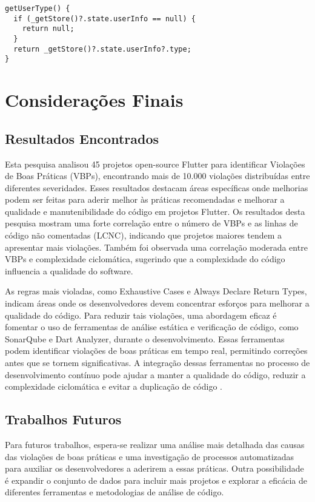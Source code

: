 \documentclass[12pt]{article}
\begin{document}
\begin{tcolorbox}[codeSnippetStyle={gsy\_github\_app\_flutter/lib/page/my\_page.dart}]
\begin{verbatim}
getUserType() {
  if (_getStore()?.state.userInfo == null) {
    return null;
  }
  return _getStore()?.state.userInfo?.type;
}
\end{verbatim}
\end{tcolorbox}

\section{Considerações Finais}
\subsection{Resultados Encontrados}
Esta pesquisa analisou 45 projetos open-source Flutter para identificar Violações de Boas Práticas (VBPs), encontrando mais de 10.000 violações distribuídas entre diferentes severidades. Esses resultados destacam áreas específicas onde melhorias podem ser feitas para aderir melhor às práticas recomendadas e melhorar a qualidade e manutenibilidade do código em projetos Flutter. Os resultados desta pesquisa mostram uma forte correlação entre o número de VBPs e as linhas de código não comentadas (LCNC), indicando que projetos maiores tendem a apresentar mais violações. Também foi observada uma correlação moderada entre VBPs e complexidade ciclomática, sugerindo que a complexidade do código influencia a qualidade do software.

As regras mais violadas, como Exhaustive Cases e Always Declare Return Types, indicam áreas onde os desenvolvedores devem concentrar esforços para melhorar a qualidade do código.
Para reduzir tais violações, uma abordagem eficaz é fomentar o uso de ferramentas de análise estática e verificação de código, como SonarQube e Dart Analyzer, durante o desenvolvimento.  Essas ferramentas podem identificar violações de boas práticas em tempo real, permitindo correções antes que se tornem significativas. A integração dessas ferramentas no processo de desenvolvimento contínuo pode ajudar a manter a qualidade do código, reduzir a complexidade ciclomática e evitar a duplicação de código \cite{kalagara2023measuring}.

\subsection{Trabalhos Futuros}
Para futuros trabalhos, espera-se realizar uma análise mais detalhada das causas das violações de boas práticas e uma investigação de processos automatizadas para auxiliar os desenvolvedores a aderirem a essas práticas. Outra possibilidade é expandir o conjunto de dados para incluir mais projetos e explorar a eficácia de diferentes ferramentas e metodologias de análise de código.



\end{document}
